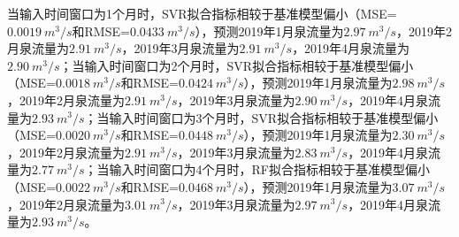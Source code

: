 当输入时间窗口为1个月时，SVR拟合指标相较于基准模型偏小（MSE=\\$\SI{0.0019}{m^{3}/s}$和RMSE=$\SI{0.0433}{m^{3}/s}$），预测2019年1月泉流量为$\SI{2.97}{m^{3}/s}$，2019年2月泉流量为$\SI{2.91}{m^{3}/s}$，2019年3月泉流量为$\SI{2.91}{m^{3}/s}$，2019年4月泉流量为$\SI{2.90}{m^{3}/s}$；当输入时间窗口为2个月时，SVR拟合指标相较于基准模型偏小（MSE=$\SI{0.0018}{m^{3}/s}$和RMSE=$\SI{0.0424}{m^{3}/s}$），预测2019年1月泉流量为$\SI{2.98}{m^{3}/s}$，2019年2月泉流量为$\SI{2.91}{m^{3}/s}$，2019年3月泉流量为$\SI{2.90}{m^{3}/s}$，2019年4月泉流量为$\SI{2.93}{m^{3}/s}$；当输入时间窗口为3个月时，SVR拟合指标相较于基准模型偏小（MSE=$\SI{0.0020}{m^{3}/s}$和RMSE=$\SI{0.0448}{m^{3}/s}$），预测2019年1月泉流量为$\SI{2.30}{m^{3}/s}$，2019年2月泉流量为$\SI{2.91}{m^{3}/s}$，2019年3月泉流量为$\SI{2.83}{m^{3}/s}$，2019年4月泉流量为$\SI{2.77}{m^{3}/s}$；当输入时间窗口为4个月时，RF拟合指标相较于基准模型偏小（MSE=$\SI{0.0022}{m^{3}/s}$和RMSE=$\SI{0.0468}{m^{3}/s}$），预测2019年1月泉流量为$\SI{3.07}{m^{3}/s}$，2019年2月泉流量为$\SI{3.01}{m^{3}/s}$，2019年3月泉流量为$\SI{2.97}{m^{3}/s}$，2019年4月泉流量为$\SI{2.93}{m^{3}/s}$。

